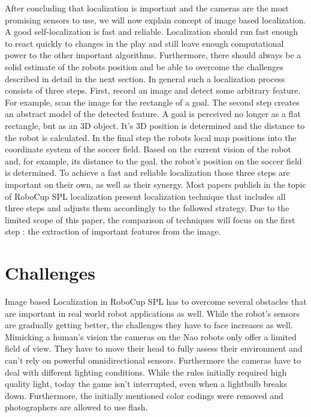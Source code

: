 \documentclass[12pt, a4paper]{scrartcl}
\begin{document}
  After concluding that localization is important and the cameras are the most promising sensors to use, we will now explain concept of image based localization. A good self-localization is fast and reliable. Localization should run fast enough to react quickly to changes in the play and still leave enough computational power to the other important algorithms. Furthermore, there should always be a solid estimate of the robots position and be able to overcome the challenges described in detail in the next section. In general such a localization process consists of three steps. First, record an image and detect some arbitrary feature. For example, scan the image for the rectangle of a goal. The second step creates an abstract model of the detected feature. A goal is perceived no longer as a flat rectangle, but as an 3D object. It's 3D position is determined and the distance to the robot is calculated. In the final step the robots local map positions into the coordinate system of the soccer field. Based on the current vision of the robot and, for example, its distance to the goal, the robot's position on the soccer field is determined. To achieve a fast and reliable localization those three steps are important on their own, as well as their synergy. Most papers publish in the topic of RoboCup SPL localization present localization technique that includes all three steps and adjusts them accordingly to the followed strategy. Due to the limited scope of this paper, the comparison of techniques will focus on the first step : the extraction of important features from the image.

  \section{Challenges}
  Image based Localization in RoboCup SPL has to overcome several obstacles that are important in real world robot applications as well. While the robot's sensors are gradually getting better, the challenges they have to face increases as well. Mimicking a human's vision the cameras on the Nao robots only offer a limited field of view. They have to move their head to fully assess their environment and can't rely on powerful omnidirectional sensors. Furthermore the cameras have to deal with different lighting conditions. While the rules initially required high quality light, today the game isn't interrupted, even when a lightbulb breaks down. Furthermore, the initially mentioned color codings were removed and photographers are allowed to use flash.
\end{document}
